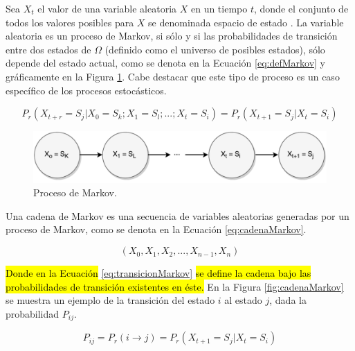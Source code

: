 Sea $X_t$ el valor de una variable aleatoria $X$ en un tiempo $t$, donde el conjunto de todos los valores posibles para $X$ se denominada espacio de estado \citep{ching2006markov}. La variable aleatoria es un proceso de Markov, si sólo y si las probabilidades de transición entre dos estados de $\Omega$ (definido como el universo de posibles estados), sólo depende del estado actual, como se denota en la Ecuación \ref{eq:defMarkov} y gráficamente en la Figura \ref{fig:procesoMarkov}. Cabe destacar que este tipo de proceso es un caso específico de los procesos estocásticos.

\begin{equation} \label{eq:defMarkov} 
	P_r(X_{t+r} = S_j | X_0 = S_k ; X_1 = S_l ; ... ; X_t = S_i) = P_r(X_{t+1} = S_j | X_t = S_i)
\end{equation}

\begin{figure}[ht!]
  \centering
    \includegraphics[scale=0.6]{images/ProcesoMarkov.pdf}
  \caption{Proceso de Markov.}
  \label{fig:procesoMarkov}
\end{figure}

Una cadena de Markov es una secuencia de variables aleatorias generadas por un proceso de Markov, como se denota en la Ecuación \ref{eq:cadenaMarkov}.

\begin{equation} \label{eq:cadenaMarkov}
	(X_0, X_1, X_2, ..., X_{n-1}, X_{n})
\end{equation}

\hl{Donde en la Ecuación} \ref{eq:transicionMarkov} \hl{se define la cadena bajo las probabilidades de transición existentes en éste.} En la Figura \ref{fig:cadenaMarkov} se muestra un ejemplo de la transición del estado $i$ al estado $j$, dada la probabilidad $P_{ij}$.

\begin{equation} \label{eq:transicionMarkov}
	P_{ij} = P_r(i \rightarrow j) = P_r(X_{t+1} = S_j | X_t = S_i)
\end{equation}

